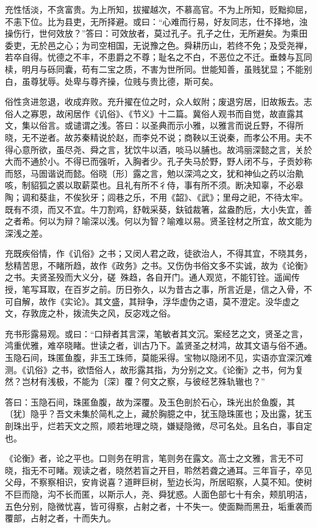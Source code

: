 \documentclass[]{article}
\begin{document}
充性恬淡，不贪富贵。为上所知，拔擢越次，不慕高官。不为上所知，贬黜抑屈，不恚下位。比为县吏，无所择避。或曰：``心难而行易，好友同志，仕不择地，浊操伤行，世何效放？''答曰：可效放者，莫过孔子。孔子之仕，无所避矣。为乘田委吏，无於邑之心；为司空相国，无说豫之色。舜耕历山，若终不免；及受尧禅，若卒自得。忧德之不丰，不患爵之不尊；耻名之不白，不恶位之不迁。垂棘与瓦同椟，明月与砾同囊，苟有二宝之质，不害为世所同。世能知善，虽贱犹显；不能别白，虽尊犹辱。处卑与尊齐操，位贱与贵比德，斯可矣。

俗性贪进忽退，收成弃败。充升擢在位之时，众人蚁附；废退穷居，旧故叛去。志俗人之寡恩，故闲居作《讥俗》、《节义》十二篇。冀俗人观书而自觉，故直露其文，集以俗言。或谴谓之浅。答曰：以圣典而示小雅，以雅言而说丘野，不得所晓，无不逆者。故苏秦精说於赵，而李兑不说；商鞅以王说秦，而孝公不用。夫不得心意所欲，虽尽尧、舜之言，犹饮牛以酒，啖马以脯也。故鸿丽深懿之言，关於大而不通於小。不得已而强听，入胸者少。孔子失马於野，野人闭不与，子贡妙称而怒，马圄谐说而懿。俗晓〔形〕露之言，勉以深鸿之文，犹和神仙之药以治鼽咳，制貂狐之裘以取薪菜也。且礼有所不彳侍，事有所不须。断决知辜，不必皋陶；调和葵韭，不俟狄牙；闾巷之乐，不用《韶》、《武》；里母之祀，不待太牢。既有不须，而又不宜。牛刀割鸡，舒戟采葵，鈇钺裁箸，盆盎酌卮，大小失宜，善之者希。何以为辩？喻深以浅。何以为智？喻难以易。贤圣铨材之所宜，故文能为深浅之差。

充既疾俗情，作《讥俗》之书；又闵人君之政，徒欲治人，不得其宜，不晓其务，愁精苦思，不睹所趋，故作《政务》之书。又伤伪书俗文多不实诚，故为《论衡》之书。夫贤圣殁而大义分，磋殊趋，各自开门。通人观览，不能钉铨。遥闻传授，笔写耳取，在百岁之前。历日弥久，以为昔古之事，所言近是，信之入骨，不可自解，故作《实论》。其文盛，其辩争，浮华虚伪之语，莫不澄定。没华虚之文，存敦庞之朴，拨流失之风，反宓戏之俗。

充书形露易观。或曰：``口辩者其言深，笔敏者其文沉。案经艺之文，贤圣之言，鸿重优雅，难卒晓睹。世读之者，训古乃下。盖贤圣之材鸿，故其文语与俗不通。玉隐石间，珠匿鱼腹，非玉工珠师，莫能采得。宝物以隐闭不见，实语亦宜深沉难测。《讥俗》之书，欲悟俗人，故形露其指，为分别之文。《论衡》之书，何为复然？岂材有浅极，不能为〔深〕覆？何文之察，与彼经艺殊轨辙也？''

答曰：玉隐石间，珠匿鱼腹，故为深覆。及玉色剖於石心，珠光出於鱼腹，其〔犹〕隐乎？吾文未集於简札之上，藏於胸臆之中，犹玉隐珠匿也；及出露，犹玉剖珠出乎，烂若天文之照，顺若地理之晓，嫌疑隐微，尽可名处。且名白，事自定也。

《论衡》者，论之平也。口则务在明言，笔则务在露文。高士之文雅，言无不可晓，指无不可睹。观读之者，晓然若盲之开目，聆然若聋之通耳。三年盲子，卒见父母，不察察相识，安肯说喜？道畔巨树，堑边长沟，所居昭察，人莫不知。使树不巨而隐，沟不长而匿，以斯示人，尧、舜犹惑。人面色部七十有余，颊肌明洁，五色分别，隐微忧喜，皆可得察，占射之者，十不失一。使面黝而黑丑，垢重袭而覆部，占射之者，十而失九。
\end{document}
